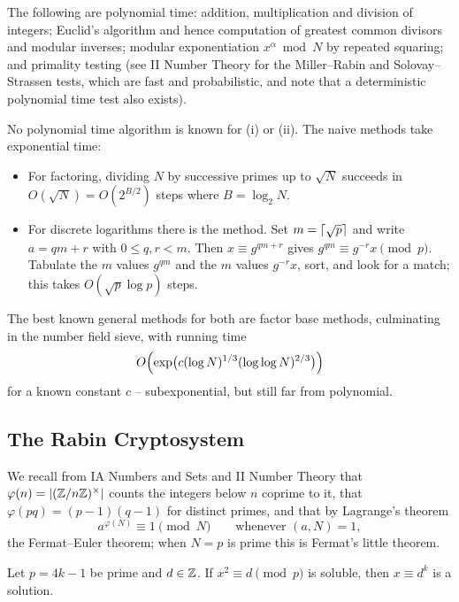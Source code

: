 \documentclass[a4paper]{scrartcl}
\DeclarePairedDelimiter{\ceil}{\lceil}{\rceil}
\begin{document}
\begin{example}
	The following are polynomial time: addition, multiplication and division of integers; Euclid's algorithm and hence computation of greatest common divisors and modular inverses; modular exponentiation $x^\alpha \bmod N$ by repeated squaring; and primality testing (see II Number Theory for the Miller--Rabin and Solovay--Strassen tests, which are fast and probabilistic, and note that a deterministic polynomial time test also exists).

	No polynomial time algorithm is known for (i) or (ii). The naive methods take exponential time:
	\begin{itemize}
		\item For factoring, dividing $N$ by successive primes up to $\sqrt N$ succeeds in $O(\sqrt N) = O(2^{B/2})$ steps where $B = \log_2N$.
		\item For discrete logarithms there is the  method. Set $m = \ceil{\sqrt p}$ and write $a = qm+r$ with $0 \le q,r<m$. Then $x \equiv g^{qm+r}$ gives $g^{qm}\equiv g^{-r}x \pmod p$. Tabulate the $m$ values $g^{qm}$ and the $m$ values $g^{-r}x$, sort, and look for a match; this takes $O(\sqrt p\log p)$ steps.
	\end{itemize}
	The best known general methods for both are factor base methods, culminating in the number field sieve, with running time
	$$O\Bigl(\exp\bigl(c(\log N)^{1/3}(\log\log N)^{2/3}\bigr)\Bigr)$$
	for a known constant $c$ -- subexponential, but still far from polynomial.
\end{example}

\subsection{The Rabin Cryptosystem}

We recall from IA Numbers and Sets and II Number Theory that  $\varphi(n) = \lvert(\mathbb{Z}/n\mathbb{Z})^\times\rvert$ counts the integers below $n$ coprime to it, that $\varphi(pq) = (p-1)(q-1)$ for distinct primes, and that by Lagrange's theorem
$$a^{\varphi(N)}\equiv1\pmod N \qquad \text{whenever } (a,N)=1,$$
the Fermat--Euler theorem; when $N=p$ is prime this is Fermat's little theorem.

\begin{lemma}\label{lem:sqrt3mod4}
	Let $p = 4k-1$ be prime and $d \in \mathbb{Z}$. If $x^2\equiv d\pmod p$ is soluble, then $x \equiv d^k$ is a solution.
\end{lemma}
\end{document}
